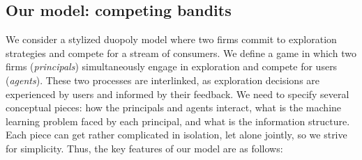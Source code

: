 



\subsection{Our model: competing bandits}
\label{sec:intro-model}

 We consider a stylized duopoly model where two firms commit to exploration strategies and compete for a stream of consumers. We define a game in which two firms (\emph{principals}) simultaneously engage in exploration and compete for users (\emph{agents}). These two processes are interlinked, as exploration decisions are experienced by users and informed by their feedback. We need to specify several conceptual pieces: how the principals and agents interact, what is the machine learning problem faced by each principal, and what is the information structure. Each piece can get rather complicated in isolation, let alone jointly, so we strive for simplicity. Thus, the key features of our model are as follows:

